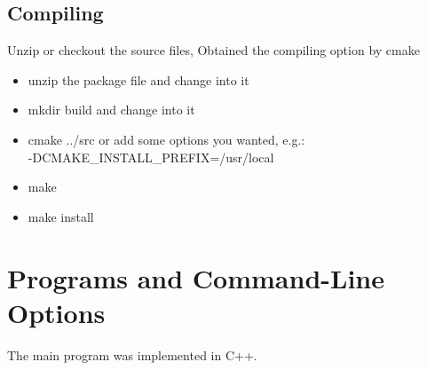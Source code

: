 \documentclass[a4paper,12pt]{article}
\begin{document}
\subsection{Compiling}
Unzip or checkout the source files, Obtained the compiling option by
cmake
\begin{itemize}
	\item unzip the package file and change into it
	\item mkdir build and change into it
	\item cmake ../src or add some options you wanted, e.g.:\\ -DCMAKE\_INSTALL\_PREFIX=/usr/local
	\item make
	\item make install
\end{itemize}

\section{Programs and Command-Line Options}

The main program was implemented in C++.
\end{document}
